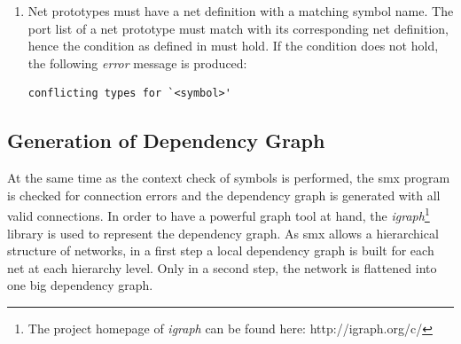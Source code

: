 \begin{enumerate}
    \item Net prototypes must have a net definition with a matching symbol name.
        The port list of a net prototype must match with its corresponding net definition, hence the condition as defined in \Equ{\ref{eq_smx_proto}} must hold.
        If the condition does not hold, the following \emph{error} message is produced:
\begin{lstlisting}[style=msg]
conflicting types for `<symbol>'
\end{lstlisting}

\end{enumerate}

\subsection{Generation of Dependency Graph}
\label{sect_tool_smxc_graph}
At the same time as the context check of symbols is performed, the \gls*{smx} program is checked for connection errors and the dependency graph is generated with all valid connections.
In order to have a powerful graph tool at hand, the \emph{igraph}\footnote{The project homepage of \emph{igraph} can be found here: http://igraph.org/c/} library is used to represent the dependency graph.
As \gls*{smx} allows a hierarchical structure of networks, in a first step a local dependency graph is built for each net at each hierarchy level.
Only in a second step, the network is flattened into one big dependency graph.


